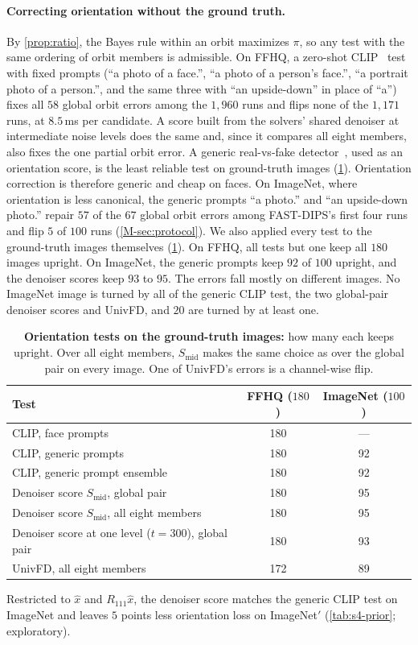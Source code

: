 \paragraph{Correcting orientation without the ground truth.}
By \cref{prop:ratio}, the Bayes rule within an orbit maximizes $\pi$, so any test with the same ordering of orbit members is admissible.
On FFHQ, a zero-shot CLIP~\cite{radford2021clip} test with fixed prompts (``a photo of a face.'', ``a photo of a person's face.'', ``a portrait photo of a person.'', and the same three with ``an upside-down'' in place of ``a'') fixes all $58$ global orbit errors among the $1{,}960$ runs and flips none of the $1{,}171$ \good runs, at $8.5$\,ms per candidate.
A score built from the solvers' shared denoiser at intermediate noise levels does the same and, since it compares all eight members, also fixes the one partial orbit error.
A generic real-vs-fake detector~\cite{ojha2023univfd}, used as an orientation score, is the least reliable test on ground-truth images (\cref{tab:s2-gt}).
Orientation correction is therefore generic and cheap on faces.
On ImageNet, where orientation is less canonical, the generic prompts ``a photo.'' and ``an upside-down photo.'' repair $57$ of the $67$ global orbit errors among FAST-DIPS's first four runs and flip $5$ of $100$ \good runs (\cref{M-sec:protocol}).
We also applied every test to the ground-truth images themselves (\cref{tab:s2-gt}).
On FFHQ, all tests but one keep all $180$ images upright.
On ImageNet, the generic prompts keep $92$ of $100$ upright, and the denoiser scores keep $93$ to $95$.
The errors fall mostly on different images.
No ImageNet image is turned by all of the generic CLIP test, the two global-pair denoiser scores and UnivFD, and $20$ are turned by at least one.

\begin{table}[h]
\centering\small
\setlength{\tabcolsep}{4pt}
\begin{tabular}{@{}lcc@{}}
\toprule
Test & FFHQ ($180$) & ImageNet ($100$) \\
\midrule
CLIP, face prompts & 180 & --- \\
CLIP, generic prompts & 180 & 92 \\
CLIP, generic prompt ensemble & 180 & 92 \\
Denoiser score $S_{\mathrm{mid}}$, global pair & 180 & 95 \\
Denoiser score $S_{\mathrm{mid}}$, all eight members & 180 & 95 \\
Denoiser score at one level ($t=300$), global pair & 180 & 93 \\
UnivFD, all eight members & 172 & 89 \\
\bottomrule
\end{tabular}
\caption{\textbf{Orientation tests on the ground-truth images:} how many each keeps upright. Over all eight members, $S_{\mathrm{mid}}$ makes the same choice as over the global pair on every image. One of UnivFD's errors is a channel-wise flip.}
\label{tab:s2-gt}
\end{table}
Restricted to $\hat x$ and $R_{111}\hat x$, the denoiser score matches the generic CLIP test on ImageNet and leaves $5$ points less orientation loss on ImageNet$'$ (\cref{tab:s4-prior}; exploratory).

